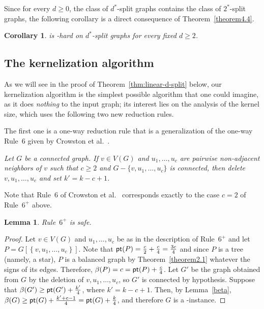 \documentclass[
final
]{dmtcs-episciences}
\newtheorem{lemma}{Lemma}{\bfseries}{\itshape}
\newtheorem{corollary}{Corollary}{\bfseries}{\itshape}
\begin{document}
Since for every $d \geq 0$, the class of  $d^*$-split graphs contains the class of $2^*$-split graphs, the following corollary is a direct consequence of Theorem~\ref{theorem4.4}.
		
\begin{corollary}\label{cor:NP-hard}
{} is {}-hard on $d^*$-split graphs for every fixed $d\geq 2$.				 
\end{corollary}











\subsection{The kernelization algorithm}
\label{subsec:linear-kernel}

As we will see in the proof of Theorem~\ref{thm:linear-d-split} below, our kernelization algorithm is the simplest possible algorithm that one could imagine, as it does {\sl nothing} to the input graph; its interest lies on the analysis of the kernel size,  which uses the following two new reduction rules.

The first one  is a one-way reduction rule that is a generalization of the one-way Rule~6 given by Crowston et al.~\cite{crowston2013maximum}.

\vspace{.3cm}

 {\it{Let $G$ be a connected graph. If $v\in V(G)$ and $u_1,\ldots,u_c$ are pairwise non-adjacent neighbors of $v$ such that $c \geq 2$ and $G - \{v,u_1,\ldots,u_c\}$ is connected, then delete $v,u_1,\ldots,u_c$ and set $k'=k-c+1$.}}

\vspace{.3cm}

Note that Rule~6 of Crowston et al.~\cite{crowston2013maximum} corresponds exactly to the case $c=2$ of Rule~$6^+$ above. 



	
\begin{lemma}\label{lem:Rule6+-safe}\label{lem:6+-safe}
Rule~$6^+$ is safe.		
\end{lemma}
		\begin{proof}
Let $v\in V(G)$ and $u_1,\ldots,u_c$ be as in the description of Rule~$6^+$ and let $P=G[\left\{v,u_1,\ldots,u_c\right\}]$. Note that ${\sf pt}(P)=\frac{c}{2}+\frac{c}{4}=\frac{3c}{4} $ and since $P$ is a tree (namely, a star), $P$ is a balanced graph by Theorem~\ref{theorem2.1} whatever the signs of its edges. Therefore, $\beta(P)=c={\sf pt}(P)+\frac{c}{4}$. Let $G'$ be the graph obtained from $G$ by the deletion of $v,u_1,\ldots,u_c$, so $G'$ is connected by hypothesis.
Suppose that $\beta(G')\geq {\sf pt}(G')+\frac{k'}{4}$, where $k'=k-c+1$. Then, by Lemma~\ref{beta}, $\beta(G)\geq {\sf pt}(G)+ \frac{k'+c-1}{4}={\sf pt}(G)+\frac{k}{4}$, and therefore $G$ is a {}-instance. 		
		\end{proof}
\end{document}
